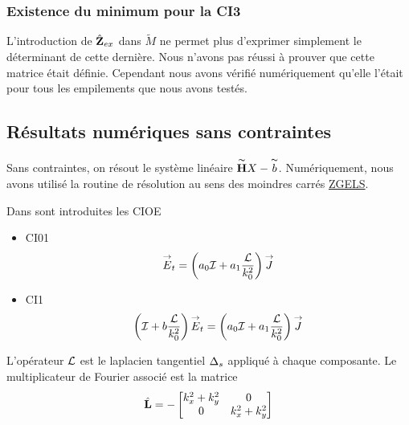 \subsubsection{Existence du minimum pour la CI3}

  L'introduction de \(\hat{\mathbf{Z}}_{ex}\) dans \(\tilde M\) ne permet plus d'exprimer simplement le déterminant de cette dernière. Nous n'avons pas réussi à prouver que cette matrice était définie. Cependant nous avons vérifié numériquement qu'elle l'était pour tous les empilements que nous avons testés.


  \subsection{Résultats numériques sans contraintes}

      Sans contraintes, on résout le système linéaire \(\overset{\thicksim}{\mathbf{H}} X - \overset{\thicksim}{b}\). Numériquement, nous avons utilisé la routine de résolution au sens des moindres carrés \href{http://www.netlib.org/lapack/explore-html/d6/d10/group__complex16_g_esolve_ga1d8089ba1e1538eb3d1ab0ebe97596c7.html}{ZGELS}.


      Dans \cite{stupfel_implementation_2015} sont introduites les CIOE
      \begin{itemize}
        \item CI01
          \begin{equation}
            {\overset{\rightarrow}{E}}_t = \left(a_0{\mathcal{I}} + a_1\dfrac{\mathcal{L}}{k_0^2}\right){\overset{\rightarrow}{J}}
          \end{equation}
        \item CI1
          \begin{equation}
            \left({\mathcal{I}} + b\dfrac{\mathcal{L}}{k_0^2} \right){\overset{\rightarrow}{E}}_t = \left(a_0{\mathcal{I}} + a_1\dfrac{\mathcal{L}}{k_0^2}\right){\overset{\rightarrow}{J}}
          \end{equation}
      \end{itemize}

      L'opérateur \(\mathcal{L}\) est le laplacien tangentiel \(\Delta_s\) appliqué à chaque composante. Le multiplicateur de Fourier associé est la matrice
      \begin{equation}
        \hat{\mathbf{L}}  = -
        \begin{bmatrix}
          k_x^2 + k_y^2 & 0
          \\
          0 & k_x^2 + k_y^2
        \end{bmatrix}
      \end{equation}

